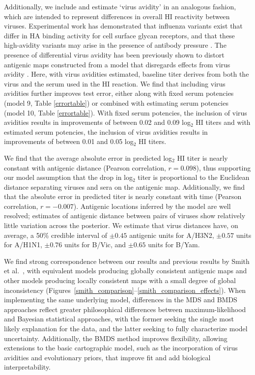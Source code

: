\documentclass[11pt,oneside,letterpaper]{article}
\begin{document}
Additionally, we include and estimate `virus avidity' in an analogous fashion, which are intended to represent differences in overall HI reactivity between viruses.
Experimental work has demonstrated that influenza variants exist that differ in HA binding activity for cell surface glycan receptors, and that these high-avidity variants may arise in the presence of antibody pressure \cite{Hensley09}.
The presence of differential virus avidity has been previously shown to distort antigenic maps constructed from a model that disregards effects from virus avidity \cite{Li13}.
Here, with virus avidities estimated, baseline titer derives from both the virus and the serum used in the HI reaction.
We find that including virus avidities further improves test error, either along with fixed serum potencies (model 9, Table \ref{errortable}) or combined with estimating serum potencies (model 10, Table \ref{errortable}).
With fixed serum potencies, the inclusion of virus avidities results in improvements of between 0.02 and 0.09 log$_2$ HI titers and with estimated serum potencies, the inclusion of virus avidities results in improvements of between 0.01 and 0.05 log$_2$ HI titers.

We find that the average absolute error in predicted log$_2$ HI titer is nearly constant with antigenic distance (Pearson correlation, $r = 0.098$), thus supporting our model assumption that the drop in log$_2$ titer is proportional to the Euclidean distance separating viruses and sera on the antigenic map.
Additionally, we find that the absolute error in predicted titer is nearly constant with time (Pearson correlation, $r = -0.007$).
Antigenic locations inferred by the model are well resolved; estimates of antigenic distance between pairs of viruses show relatively little variation across the posterior.
We estimate that virus distances have, on average, a 50\% credible interval of $\pm0.45$ antigenic units for A/H3N2, $\pm0.57$ units for A/H1N1, $\pm0.76$ units for B/Vic, and $\pm0.65$ units for B/Yam.

We find strong correspondence between our results and previous results by Smith et al.\ \cite{Smith04}, with equivalent models producing globally consistent antigenic maps and other models producing locally consistent maps with a small degree of global inconsistency (Figures~\ref{smith_comparison}--\ref{smith_comparison_effects}).
When implementing the same underlying model, differences in the MDS and BMDS approaches reflect greater philosophical differences between maximum-likelihood and Bayesian statistical approaches, with the former seeking the single most likely explanation for the data, and the latter seeking to fully characterize model uncertainty.
Additionally, the BMDS method improves flexibility, allowing extensions to the basic cartographic model, such as the incorporation of virus avidities and evolutionary priors, that improve fit and add biological interpretability.
\end{document}
